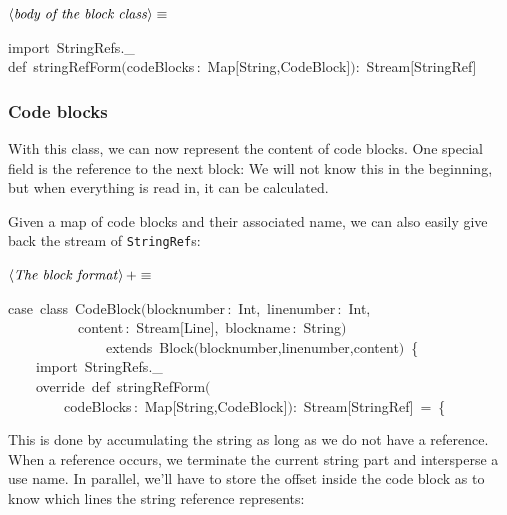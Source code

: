 \documentclass[a4paper,12pt]{article}
\begin{document}
$\left<\mbox{\emph{body of the block class}}\right>\equiv$
\begin{program}{\vem import}~StringRefs.\_
\\[0.5em]{\vem def}~stringRefForm$($codeBlocks\,{\rm :}~Map$[$String,CodeBlock$]$$)${\rm :}~Stream$[$StringRef$]$
\\[0.5em]\end{program}
\subsubsection{Code blocks}
With this class, we can now represent the content of code blocks.
One special field is the reference to the next block: We will not
know this in the beginning, but when everything is read in, it
can be calculated.

Given a map of code blocks and their associated name, we can also
easily give back the stream of \texttt{StringRef}s:

$\left<\mbox{\emph{The block format}}\right>+\equiv$
\begin{program}{\vem case}~{\vem class}~CodeBlock$($blocknumber\,{\rm :}~Int,~linenumber\,{\rm :}~Int,
\\~~~~~~~~~~content\,{\rm :}~Stream$[$Line$]$,~blockname\,{\rm :}~String$)$
\\~~~~~~~~~~~~~~{\vem extends}~Block$($blocknumber,linenumber,content$)$~{\small\{}
\\~~~~{\vem import}~StringRefs.\_
\\~~~~{\vem override}~{\vem def}~stringRefForm$($
\\~~~~~~~~codeBlocks\,{\rm :}~Map$[$String,CodeBlock$]$$)${\rm :}~Stream$[$StringRef$]$~=~{\small\{}
\\[0.5em]\end{program}
This is done by accumulating the string as long as we do not have
a reference. When a reference occurs, we terminate the current string
part and intersperse a use name. In parallel, we'll have to store the
offset inside the code block as to know which lines the string reference
represents:
\end{document}
